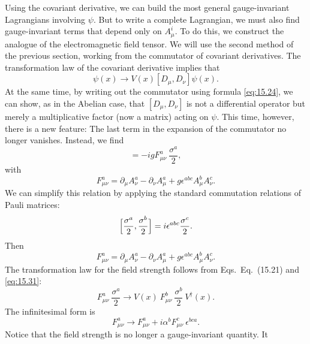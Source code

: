 Using the covariant derivative, we can build the most general gauge-invariant
Lagrangians involving $\psi$.  But to write a complete Lagrangian, we must
also find gauge-invariant terms that depend only on $A_\mu^i$.  To do this, we
construct the analogue of the electromagnetic field tensor.  We will use the
second method of the previous section, working from the commutator of
covariant derivatives.  The transformation law of the covariant derivative
implies that
\begin{equation}
  [D_\mu, D_\nu]\psi(x) \to V(x)[D_\mu, D_\nu]\psi(x) .
  \label{eq:15.31}
\end{equation}
At the same time, by writing out the commutator using formula
\eqref{eq:15.24}, we can show, as in the Abelian case, that $[D_\mu, D_\nu]$
is not a differential operator but merely a multiplicative factor (now a
matrix) acting on $\psi$.  This time, however, there is a new feature: The
last term in the expansion of the commutator no longer vanishes.  Instead, we
find
\begin{equation}
  [D_\mu, D_\nu] = -igF^a_{\mu\nu}\ \frac{\sigma^a}{2} ,
  \label{eq:15.32}
\end{equation}
with
\begin{equation}
  F^a_{\mu\nu} = \partial_\mu A_\nu^a - \partial_\nu A_\mu^a
    + g\epsilon^{abc}A_\mu^b A_\nu^c .
  \label{eq:15.33}
\end{equation}
We can simplify this relation by applying the standard commutation relations
of Pauli matrices:
\begin{equation}
  \Bigl[ \frac{\sigma^a}{2}, \frac{\sigma^b}{2} \Bigr] = i\epsilon^{abc}
    \frac{\sigma^c}{2} .
  \label{eq:15.34}
\end{equation}
Then
\begin{equation}
  F^a_{\mu\nu} = \partial_\mu A_\nu^a - \partial_\nu A_\mu^a
    + g\epsilon^{abc}A_\mu^b A_\nu^c .
  \label{eq:15.35}
\end{equation}
The transformation law for the field strength follows from Eqs.~Eq.~(15.21)
and \eqref{eq:15.31}:
\begin{equation}
  F^a_{\mu\nu}\ \frac{\sigma^a}{2} \to V(x)\ F^b_{\mu\nu}\ \frac{\sigma^b}{2}\
    V^{\dagger}(x) .
  \label{eq:15.36}
\end{equation}
The infinitesimal form is
\begin{equation}
  F^a_{\mu\nu} \to F^a_{\mu\nu} + i\alpha^b F^c_{\mu\nu}\ \epsilon^{bca} .
  \label{eq:15.37}
\end{equation}
Notice that the field strength is no longer a gauge-invariant quantity.  It
